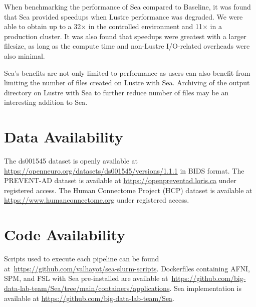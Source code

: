 \documentclass[pdflatex,sn-mathphys-num]{sn-jnl}
\theoremstyle{thmstyleone}%
\theoremstyle{thmstyletwo}%
\theoremstyle{thmstylethree}%
\begin{document}
    When benchmarking the performance of Sea compared to Baseline, it was found that Sea provided speedups
    when Lustre performance was degraded. We were able to obtain up to a
    32$\times$ in the controlled environment and 11$\times$ in a production
    cluster. It was also found that speedups were greatest with a larger
    filesize, as long as the compute time and non-Lustre I/O-related overheads
    were also minimal.

    Sea's benefits are not only limited to performance as
    users can also benefit from limiting the number of files created on Lustre
    with Sea. Archiving of the output directory on Lustre with Sea to further
    reduce number of files may be an interesting addition to Sea.
    
    
    
    
    
    
    
    
    
    

    \section*{Data Availability}

    The ds001545 dataset is openly available at \url{https://openneuro.org/datasets/ds001545/versions/1.1.1} in BIDS format.
    The PREVENT-AD dataset is available at \url{https://openpreventad.loris.ca} under registered access.
    The Human Connectome Project (HCP) dataset is available at \url{https://www.humanconnectome.org} under registered access.

    \section*{Code Availability}

    Scripts used to
    execute each pipeline can be found
    at~\url{https://github.com/valhayot/sea-slurm-scripts}. 
    Dockerfiles containing AFNI, SPM, and FSL with Sea pre-installed are available
    at~\url{https://github.com/big-data-lab-team/Sea/tree/main/containers/applications}. Sea implementation is available at \url{https://github.com/big-data-lab-team/Sea}.
\end{document}
